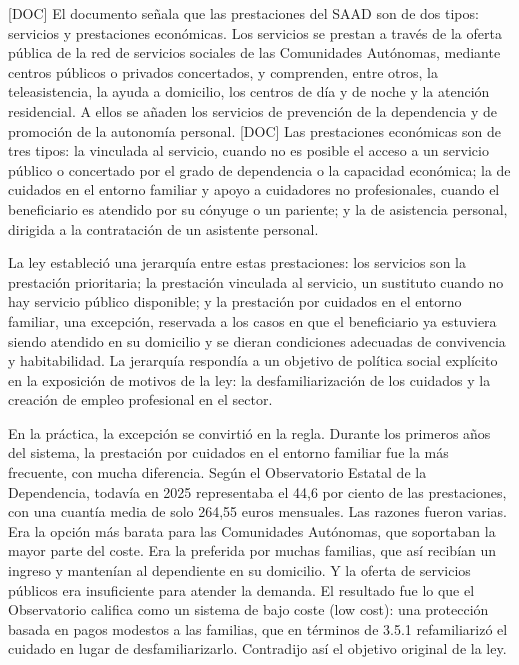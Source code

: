 \documentclass[10pt,a4paper]{article}
\begin{document}
[DOC] El documento señala que las prestaciones del SAAD son de dos tipos: servicios y prestaciones económicas. Los servicios se prestan a través de la oferta pública de la red de servicios sociales de las Comunidades Autónomas, mediante centros públicos o privados concertados, y comprenden, entre otros, la teleasistencia, la ayuda a domicilio, los centros de día y de noche y la atención residencial. A ellos se añaden los servicios de prevención de la dependencia y de promoción de la autonomía personal. [DOC] Las prestaciones económicas son de tres tipos: la vinculada al servicio, cuando no es posible el acceso a un servicio público o concertado por el grado de dependencia o la capacidad económica; la de cuidados en el entorno familiar y apoyo a cuidadores no profesionales, cuando el beneficiario es atendido por su cónyuge o un pariente; y la de asistencia personal, dirigida a la contratación de un asistente personal.

La ley estableció una jerarquía entre estas prestaciones: los servicios son la prestación prioritaria; la prestación vinculada al servicio, un sustituto cuando no hay servicio público disponible; y la prestación por cuidados en el entorno familiar, una excepción, reservada a los casos en que el beneficiario ya estuviera siendo atendido en su domicilio y se dieran condiciones adecuadas de convivencia y habitabilidad. La jerarquía respondía a un objetivo de política social explícito en la exposición de motivos de la ley: la desfamiliarización de los cuidados y la creación de empleo profesional en el sector.

En la práctica, la excepción se convirtió en la regla. Durante los primeros años del sistema, la prestación por cuidados en el entorno familiar fue la más frecuente, con mucha diferencia. Según el Observatorio Estatal de la Dependencia, todavía en 2025 representaba el 44,6 por ciento de las prestaciones, con una cuantía media de solo 264,55 euros mensuales. Las razones fueron varias. Era la opción más barata para las Comunidades Autónomas, que soportaban la mayor parte del coste. Era la preferida por muchas familias, que así recibían un ingreso y mantenían al dependiente en su domicilio. Y la oferta de servicios públicos era insuficiente para atender la demanda. El resultado fue lo que el Observatorio califica como un sistema de bajo coste (low cost): una protección basada en pagos modestos a las familias, que en términos de 3.5.1 refamiliarizó el cuidado en lugar de desfamiliarizarlo. Contradijo así el objetivo original de la ley.
\end{document}

